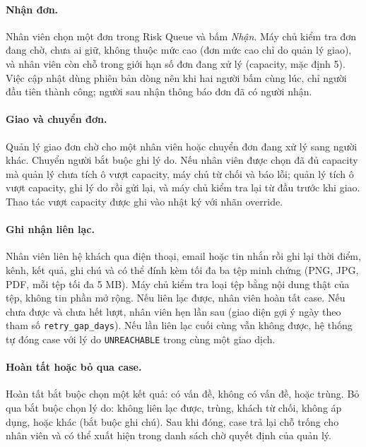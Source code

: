 
\paragraph{Nhận đơn.} Nhân viên chọn một đơn trong Risk Queue và bấm \textit{Nhận}. Máy chủ kiểm
tra đơn đang chờ, chưa ai giữ, không thuộc mức cao (đơn mức cao chỉ do quản lý giao), và nhân viên
còn chỗ trong giới hạn số đơn đang xử lý (capacity, mặc định 5). Việc cập nhật dùng phiên bản dòng
nên khi hai người bấm cùng lúc, chỉ người đầu tiên thành công; người sau nhận thông báo đơn đã có
người nhận.


\paragraph{Giao và chuyển đơn.} Quản lý giao đơn chờ cho một nhân viên hoặc chuyển đơn đang xử lý
sang người khác. Chuyển người bắt buộc ghi lý do. Nếu nhân viên được chọn đã đủ capacity mà quản lý
chưa tích ô vượt capacity, máy chủ từ chối và báo lỗi; quản lý tích ô vượt capacity, ghi lý do rồi gửi
lại, và máy chủ kiểm tra lại từ đầu trước khi giao. Thao tác vượt capacity được ghi vào nhật ký với
nhãn override.


\paragraph{Ghi nhận liên lạc.} Nhân viên liên hệ khách qua điện thoại, email hoặc tin nhắn rồi ghi
lại thời điểm, kênh, kết quả, ghi chú và có thể đính kèm tối đa ba tệp minh chứng (PNG, JPG, PDF,
mỗi tệp tối đa 5 MB). Máy chủ kiểm tra loại tệp bằng nội dung thật của tệp, không tin phần mở rộng.
Nếu liên lạc được, nhân viên hoàn tất case. Nếu chưa được và chưa hết lượt, nhân viên hẹn lần sau
(giao diện gợi ý ngày theo tham số \texttt{retry\_gap\_days}). Nếu lần liên lạc cuối cùng vẫn không
được, hệ thống tự đóng case với lý do \texttt{UNREACHABLE} trong cùng một giao dịch.


\paragraph{Hoàn tất hoặc bỏ qua case.} Hoàn tất bắt buộc chọn một kết quả: có vấn đề, không có vấn
đề, hoặc trùng. Bỏ qua bắt buộc chọn lý do: không liên lạc được, trùng, khách từ chối, không áp dụng,
hoặc khác (bắt buộc ghi chú). Sau khi đóng, case trả lại chỗ trống cho nhân viên và có thể xuất hiện
trong danh sách chờ quyết định của quản lý.

